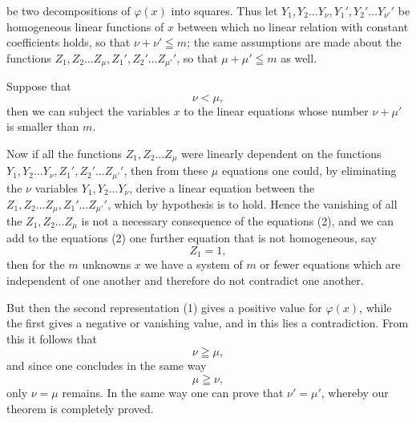 be two decompositions of $\varphi(x)$ into squares. Thus let $Y_1, Y_2 \ldots Y_\nu, Y_1', Y_2' \ldots Y_{\nu'}'$ be homogeneous linear functions of $x$ between which no linear relation with constant coefficients holds, so that $\nu + \nu' \leqq m$; the same assumptions are made about the functions $Z_1, Z_2 \ldots Z_\mu, Z_1', Z_2' \ldots Z_{\mu'}'$, so that $\mu + \mu' \leqq m$ as well.

Suppose that
\[
\nu < \mu,
\]
then we can subject the variables $x$ to the linear equations
whose number $\nu + \mu'$ is smaller than $m$.

Now if all the functions $Z_1, Z_2 \ldots Z_\mu$ were linearly dependent on the functions $Y_1, Y_2 \ldots Y_\nu, Z_1', Z_2' \ldots Z_{\mu'}'$, then from these $\mu$ equations one could, by eliminating the $\nu$ variables $Y_1, Y_2 \ldots Y_\nu$, derive a linear equation between the $Z_1, Z_2 \ldots Z_\mu, Z_1' \ldots Z_{\mu'}'$, which by hypothesis is  to hold. Hence the vanishing of all the $Z_1, Z_2 \ldots Z_\mu$ is not a necessary consequence of the equations (2), and we can add to the equations (2) one further equation that is not homogeneous, say
\[
Z_1 = 1,
\]
then for the $m$ unknowns $x$ we have a system of $m$ or fewer equations which are independent of one another and therefore do not contradict one another.

But then the second representation (1) gives a positive value for $\varphi(x)$, while the first gives a negative or vanishing value, and in this lies a contradiction. From this it follows that
\[
\nu \geqq \mu,
\]
and since one concludes in the same way
\[
\mu \geqq \nu,
\]
only $\nu = \mu$ remains. In the same way one can prove that $\nu' = \mu'$, whereby our theorem is completely proved.
